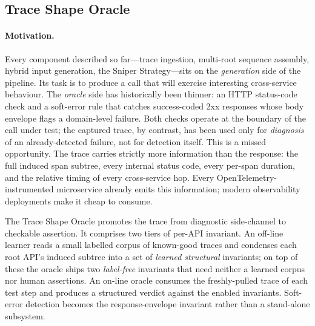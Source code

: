 \documentclass[conference]{IEEEtran}
\begin{document}
\subsection{Trace Shape Oracle}\label{ssec:tso}

\paragraph{Motivation.}
Every component described so far---trace ingestion, multi-root sequence assembly, hybrid input generation, the Sniper Strategy---sits on the \emph{generation} side of the pipeline. Its task is to produce a call that will exercise interesting cross-service behaviour. The \emph{oracle} side has historically been thinner: an HTTP status-code check and a soft-error rule that catches success-coded 2xx responses whose body envelope flags a domain-level failure. Both checks operate at the boundary of the call under test; the captured trace, by contrast, has been used only for \emph{diagnosis} of an already-detected failure, not for detection itself. This is a missed opportunity. The trace carries strictly more information than the response: the full induced span subtree, every internal status code, every per-span duration, and the relative timing of every cross-service hop. Every OpenTelemetry-instrumented microservice already emits this information; modern observability deployments make it cheap to consume.

The Trace Shape Oracle promotes the trace from diagnostic side-channel to checkable assertion. It comprises two tiers of per-API invariant. An off-line learner reads a small labelled corpus of known-good traces and condenses each root API's induced subtree into a set of \emph{learned structural} invariants; on top of these the oracle ships two \emph{label-free} invariants that need neither a learned corpus nor human assertions. An on-line oracle consumes the freshly-pulled trace of each test step and produces a structured verdict against the enabled invariants. Soft-error detection becomes the response-envelope invariant rather than a stand-alone subsystem.
\end{document}
